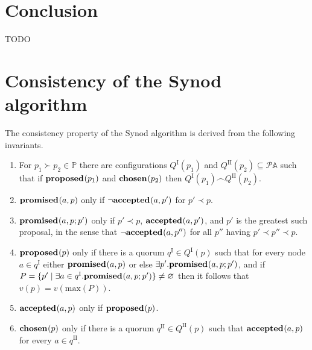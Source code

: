 \documentclass[journal]{IEEEtran}
\begin{document}




\section{Conclusion}

TODO


\pagebreak

\appendices
\section{Consistency of the Synod algorithm}
\label{synod-safety}

The consistency property of the Synod algorithm is derived from the following
invariants.

\begin{enumerate}

\item \label{synod-quorums} For $p_1 \succ p_2 \in \mathbb P$ there are
configurations $Q^\textrm{I}(p_1)$ and $Q^\textrm{II}(p_2) \subseteq \mathcal P
\mathbb A$ such that if $\mathbf{proposed}_{}(p_1)$ and $\mathbf{chosen}_{}(p_2)$ then
${Q^\textrm{I}(p_1) \frown Q^\textrm{II}(p_2)}$.

\item \label{synod-fprom} $\mathbf{promised}_{}(a,p)$ only if $\neg\mathbf{accepted}_{}(a,p')$ for ${p'
\prec p}$.

\item \label{synod-bprom} $\mathbf{promised}_{}(a,p;p')$ only if $p' \prec p$,
$\mathbf{accepted}_{}(a,p')$, and $p'$ is the greatest such proposal, in the sense that
$\neg\mathbf{accepted}_{}(a,p'')$ for all $p''$ having $p' \prec p'' \prec p$.

\item \label{synod-prop} $\mathbf{proposed}_{}(p)$ only if there is a quorum $q^\textrm{I}
\in Q^\textrm{I}(p)$ such that for every node $a \in q^\textrm{I}$ either
$\mathbf{promised}_{}(a,p)$ or else $\exists p'.  \mathbf{promised}_{}(a,p;p')$, and if ${P = \{ p'
\mid \exists a \in q^\textrm{I}. \mathbf{promised}_{}(a,p;p') \} \ne \varnothing}$ then
it follows that $v(p) = v(\mathrm{max}(P))$.

\item \label{synod-acc} $\mathbf{accepted}_{}(a,p)$ only if $\mathbf{proposed}_{}(p)$.

\item \label{synod-chosen} $\mathbf{chosen}_{}(p)$ only if there is a quorum
$q^\textrm{II} \in Q^\textrm{II}(p)$ such that $\mathbf{accepted}_{}(a,p)$ for every $a \in
q^\textrm{II}$.

\end{enumerate}
\end{document}
